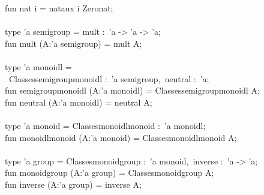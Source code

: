 \begin{isabellebody}
\begin{isamarkuptext}
\hspace*{0pt}fun nat i = nat{}aux i Zero{}nat;\\
\hspace*{0pt}\\
\hspace*{0pt}type 'a semigroup = {}mult :~'a -> 'a -> 'a{};\\
\hspace*{0pt}fun mult (A{}:'a semigroup) = {}mult A{};\\
\hspace*{0pt}\\
\hspace*{0pt}type 'a monoidl =\\
\hspace*{0pt} ~{}Classes{}{}semigroup{}monoidl :~'a semigroup,~neutral :~'a{};\\
\hspace*{0pt}fun semigroup{}monoidl (A{}:'a monoidl) = {}Classes{}{}semigroup{}monoidl A{};\\
\hspace*{0pt}fun neutral (A{}:'a monoidl) = {}neutral A{};\\
\hspace*{0pt}\\
\hspace*{0pt}type 'a monoid = {}Classes{}{}monoidl{}monoid :~'a monoidl{};\\
\hspace*{0pt}fun monoidl{}monoid (A{}:'a monoid) = {}Classes{}{}monoidl{}monoid A{};\\
\hspace*{0pt}\\
\hspace*{0pt}type 'a group = {}Classes{}{}monoid{}group :~'a monoid,~inverse :~'a -> 'a{};\\
\hspace*{0pt}fun monoid{}group (A{}:'a group) = {}Classes{}{}monoid{}group A{};\\
\hspace*{0pt}fun inverse (A{}:'a group) = {}inverse A{};\\
\hspace*{0pt}\\

\end{isamarkuptext}
\end{isabellebody}
